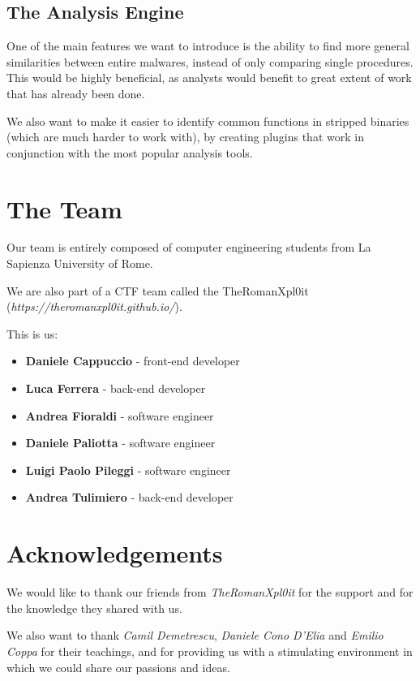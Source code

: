 \documentclass{article}
\begin{document}
\subsection{The Analysis Engine}

One of the main features we want to introduce is the ability to find more general similarities between entire malwares, instead of only comparing single procedures. \\

This would be highly beneficial, as analysts would benefit to great extent of work that has already been done.

\par

We also want to make it easier to identify common functions in stripped binaries (which are much harder to work with), by creating plugins that work in conjunction with the most popular analysis tools.


\section{The Team}

Our team is entirely composed of computer engineering students from La Sapienza University of Rome.\par
We are also part of a CTF team called the TheRomanXpl0it (\textit{https://theromanxpl0it.github.io/}).\par

This is us:

\begin{itemize}
  \item \textbf{Daniele Cappuccio} - front-end developer
  \item \textbf{Luca Ferrera} - back-end developer
  \item \textbf{Andrea Fioraldi} - software engineer
  \item \textbf{Daniele Paliotta} - software engineer
  \item \textbf{Luigi Paolo Pileggi} - software engineer
  \item \textbf{Andrea Tulimiero}  - back-end developer
\end{itemize}


\section{Acknowledgements}

We would like to thank our friends from \textit{TheRomanXpl0it} for the support and for the knowledge they shared with us.\par 

We also want to thank \textit{Camil Demetrescu}, \textit{Daniele Cono D'Elia} and \textit{Emilio Coppa} for their teachings, and for providing us with a stimulating environment in which we could share our passions and ideas.
\end{document}
